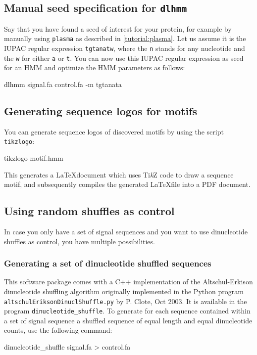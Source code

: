 \documentclass[a4paper]{article}
\newcommand{\plasma}[0]{\texttt{plasma}}
\newcommand{\dlhmm}[0]{\texttt{dlhmm}}
\newcommand{\dinuclshuffle}[0]{\texttt{dinucleotide\_shuffle}}
\newcommand{\TikZ}{Ti\emph{k}Z}
\begin{document}
\subsection{Manual seed specification for \dlhmm{}}
Say that you have found a seed of interest for your protein, for example by manually using \plasma{} as described in \cref{tutorial:plasma}.
Let us assume it is the IUPAC regular expression \verb|tgtanatw|, where the \verb|n| stands for any nucleotide and the \verb|w| for either \verb|a| or \verb|t|.
You can now use this IUPAC regular expression as seed for an HMM and optimize the HMM parameters as follows:\\
\begin{verbbox}
dlhmm signal.fa control.fa -m tgtanata
\end{verbbox}
\fbox{\theverbbox[t]}


\subsection{Generating sequence logos for motifs}
You can generate sequence logos of discovered motifs by using the script \verb|tikzlogo|:\\
\begin{verbbox}
tikzlogo motif.hmm
\end{verbbox}
\fbox{\theverbbox[t]}

This generates a \LaTeX document which uses \TikZ{} code to draw a sequence motif, and subsequently compiles the generated \LaTeX file into a PDF document.

\subsection{Using random shuffles as control}
In case you only have a set of signal sequences and you want to use dinucleotide shuffles as control, you have multiple possibilities.
\subsubsection{Generating a set of dinucleotide shuffled sequences}
This software package comes with a C++ implementation of the Altschul-Erkison dinucleotide shuffling algorithm originally implemented in the Python program \verb|altschulEriksonDinuclShuffle.py| by P. Clote, Oct 2003.
It is available in the program \dinuclshuffle{}.
To generate for each sequence contained within a set of signal sequence a shuffled sequence of equal length and equal dinucleotide counts, use the following command:\\
\begin{verbbox}
dinucleotide_shuffle signal.fa > control.fa
\end{verbbox}
\fbox{\theverbbox[t]}
\end{document}
